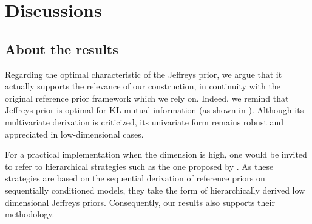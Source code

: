 \section{Discussions}


    \subsection{About the results}




Regarding the optimal characteristic of the Jeffreys prior, we argue that it actually supports  the relevance of our construction, in continuity with the original reference prior framework which we rely on. Indeed, we remind that Jeffreys prior is optimal for KL-mutual information (as shown in \cite{clarke_jeffreys_1994}). Although its multivariate derivation is criticized, its univariate form remains robust and appreciated in low-dimensional cases.


For a practical implementation when the dimension is high, one would be invited to refer to hierarchical strategies such as the one proposed by \citet{berger_overall_2015}. 
As these strategies are based on the sequential derivation of reference priors on sequentially conditioned models, they take the form of hierarchically derived low dimensional Jeffreys priors. Consequently, our results also supports their methodology.


